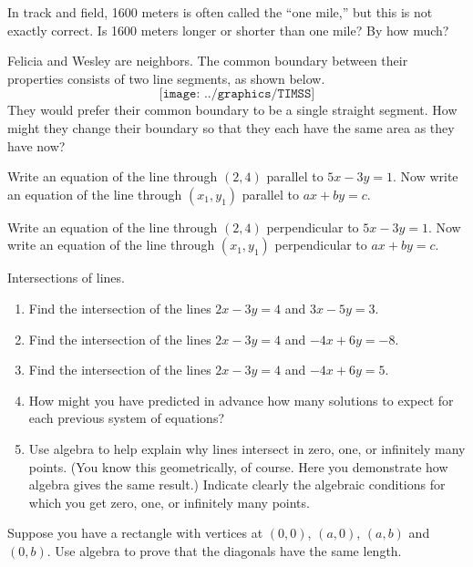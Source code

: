 \begin{prob}
In track and field, 1600 meters is often called the ``one mile,'' but this is not exactly correct.  Is 1600 meters longer or shorter than one mile?  By how much?  
\end{prob}

\begin{prob}
Felicia and Wesley are neighbors.  The common boundary between their properties consists of two line segments, as shown below.  
$$\texttt{[image: ../graphics/TIMSS]}$$
They would prefer their common boundary to be a single straight segment.  How might they change their boundary so that they 
each have the same area as they have now?  
\end{prob}

\begin{prob}
Write an equation of the line through $(2,4)$ parallel to $5x-3y=1$.  
Now write an equation of the line through $(x_1,y_1)$ parallel to $ax+by=c$. 
\end{prob}

\begin{prob}
Write an equation of the line through $(2,4)$ perpendicular to $5x-3y=1$.  
Now write an equation of the line through $(x_1,y_1)$ perpendicular to $ax+by=c$. 
\end{prob}

\begin{prob}
Intersections of lines.  
\begin{enumerate}
\item Find the intersection of the lines $2x-3y=4$ and $3x-5y=3$.  
\item Find the intersection of the lines $2x-3y=4$ and $-4x+6y=-8$.
\item Find the intersection of the lines $2x-3y=4$ and $-4x+6y=5$.
\item How might you have predicted in advance how many solutions to expect for each previous system of equations?
\item Use algebra to help explain why lines intersect in zero, one, or infinitely many points.  (You know this geometrically, of course.  Here you demonstrate how algebra gives the same result.)  Indicate clearly the algebraic conditions
for which you get zero, one, or infinitely many points.  
\end{enumerate}
\end{prob}

\begin{prob}
Suppose you have a rectangle with vertices at $(0,0)$, $(a,0)$,
$(a,b)$ and $(0,b)$. Use algebra to prove that the diagonals have the
same length.
\end{prob}

